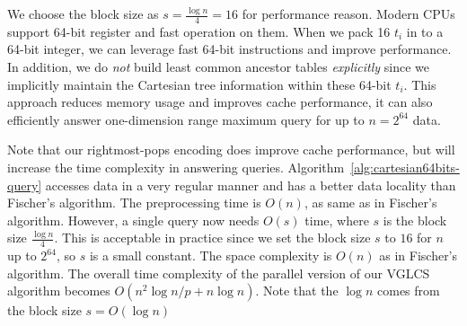 

We choose the block size as $s = \frac{\log n}{4} = 16$ for performance
reason.  Modern CPUs support 64-bit register and fast operation on them.
When we pack 16 $t_i$ in to a 64-bit integer, we can leverage fast
64-bit instructions and improve performance.  In addition, we do {\em
not} build least common ancestor tables {\em explicitly} since we
implicitly maintain the Cartesian tree information within these 64-bit
$t_i$.  This approach reduces memory usage and improves cache
performance, it can also efficiently answer one-dimension range maximum
query for up to $n = 2^{64}$ data.

Note that our rightmost-pops encoding does improve cache performance,
but will increase the time complexity in answering queries.
Algorithm~\ref{alg:cartesian64bits-query} accesses data in a very
regular manner and has a better data locality than Fischer's algorithm.
The preprocessing time is $O(n)$, as same as in Fischer's algorithm.
However, a single query now needs $O(s)$ time, where $s$ is the block
size $\frac{\log n}{4}$.  This is acceptable in practice since we set
the block size $s$ to $16$ for $n$ up to $2^{64}$, so $s$ is a small
constant.  The space complexity is $O(n)$ as in Fischer's algorithm. The
overall time complexity of the parallel version of our VGLCS algorithm
becomes $O(n^2 \log{n} / p + n \log n)$.  Note that the $\log n$ comes
from the block size $s = O(\log n)$
